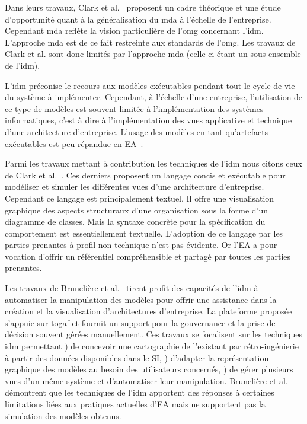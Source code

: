 Dans leurs travaux, Clark et al.~\cite{clark_towards_2014} proposent un cadre théorique et une étude d'opportunité quant à la généralisation du \gls{mda} à l'échelle de l'entreprise. Cependant \gls{mda} reflète la vision particulière de l'\gls{omg} concernant l'\gls{idm}. L'approche \gls{mda} est de ce fait restreinte aux standards de l'\gls{omg}. Les travaux de Clark et al. sont donc limités par l'approche \gls{mda} (celle-ci étant un sous-ensemble de l'\gls{idm}).

L'\gls{idm} préconise le recours aux modèles exécutables pendant tout le cycle de vie du système à implémenter. Cependant, à l'échelle d'une entreprise, l'utilisation de ce type de modèles est souvent limitée à l'implémentation des systèmes informatiques, c'est à dire à l'implémentation des vues applicative et technique d'une architecture d'entreprise. L'usage des modèles en tant qu'artefacts exécutables est peu répandue en EA~\cite{kulkarni_modelling_2013}.

Parmi les travaux mettant à contribution les techniques de l'\gls{idm} nous citons ceux de Clark et al.~\cite{clark2011leap}. Ces derniers proposent un langage concis et exécutable pour modéliser et simuler les différentes vues d'une architecture d'entreprise. Cependant ce langage est principalement textuel. Il offre une visualisation graphique des aspects structuraux d'une organisation sous la forme d'un diagramme de classes. Mais la syntaxe concrète pour la spécification du comportement est essentiellement textuelle. L'adoption de ce langage par les parties prenantes à profil non technique n'est pas évidente. Or l'EA a pour vocation d'offrir un référentiel compréhensible et partagé par toutes les parties prenantes.

Les travaux de Brunelière et al.~\cite{bruneliere2013mde} tirent profit des capacités de l'\gls{idm} à automatiser la manipulation des modèles pour offrir une assistance dans la création et la visualisation d'architectures d'entreprise. La plateforme proposée s'appuie sur \gls{togaf} et fournit un support pour la gouvernance et la prise de décision souvent gérées manuellement. Ces travaux se focalisent sur les techniques \gls{idm} permettant \primo\!) de concevoir une cartographie de l'existant par rétro-ingénierie à partir des données disponibles dans le SI, \secundo\!) d'adapter la représentation graphique des modèles au besoin des utilisateurs concernés, \tertio\!) de gérer plusieurs vues d'un même système et d'automatiser leur manipulation. Brunelière et al.~\cite{bruneliere2013mde} démontrent que les techniques de l'\gls{idm} apportent des réponses à certaines limitations liées aux pratiques actuelles d'EA mais ne supportent pas la simulation des modèles obtenus. 

